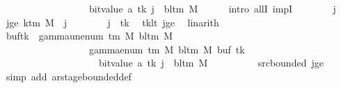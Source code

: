 \begin{isabellebody}
\ \ \ \ \ \ \ \ \ \ \ \ \ \ \ \ \ {\isacharplus}{\kern0pt}\ bit{\isacharunderscore}{\kern0pt}value\ {\isacharparenleft}{\kern0pt}{\isacharquery}{\kern0pt}a\ tk{\isacharparenright}{\kern0pt}{\isacharparenright}{\kern0pt}{\isacharparenright}{\kern0pt}{\isacharparenright}{\kern0pt}\ j\ {\isacharequal}{\kern0pt}\ bl{\isacharunderscore}{\kern0pt}tm\ M{\isachardoublequoteclose}\isanewline
\ \ \ \ \isamarkupfalse%
\ {\isacharparenleft}{\kern0pt}intro\ allI\ impI{\isacharparenright}{\kern0pt}\isanewline
\ \ \ \ \ \ \isamarkupfalse%
\ j\ \isamarkupfalse%
\ jge{\isacharcolon}{\kern0pt}\ {\isachardoublequoteopen}k{\isacharunderscore}{\kern0pt}tm\ M\ {\isasymle}\ j{\isachardoublequoteclose}\isanewline
\ \ \ \ \ \ \isamarkupfalse%
\ {\isachardoublequoteopen}j\ {\isasymnoteq}\ tk{\isachardoublequoteclose}\ \isamarkupfalse%
\ tk{\isacharunderscore}{\kern0pt}lt\ jge\ \isamarkupfalse%
\ linarith\isanewline
\ \ \ \ \ \ \isamarkupfalse%
\ {\isachardoublequoteopen}{\isacharparenleft}{\kern0pt}buf{\isacharparenleft}{\kern0pt}tk\ {\isacharcolon}{\kern0pt}{\isacharequal}{\kern0pt}\ gamma{\isacharunderscore}{\kern0pt}unenum\ {\isacharparenleft}{\kern0pt}{\isasymGamma}{\isacharunderscore}{\kern0pt}tm\ M{\isacharparenright}{\kern0pt}\ {\isacharparenleft}{\kern0pt}bl{\isacharunderscore}{\kern0pt}tm\ M{\isacharparenright}{\kern0pt}\isanewline
\ \ \ \ \ \ \ \ \ \ \ \ \ \ \ \ {\isacharparenleft}{\kern0pt}{}\ {\isacharasterisk}{\kern0pt}\ gamma{\isacharunderscore}{\kern0pt}enum\ {\isacharparenleft}{\kern0pt}{\isasymGamma}{\isacharunderscore}{\kern0pt}tm\ M{\isacharparenright}{\kern0pt}\ {\isacharparenleft}{\kern0pt}bl{\isacharunderscore}{\kern0pt}tm\ M{\isacharparenright}{\kern0pt}\ {\isacharparenleft}{\kern0pt}buf\ tk{\isacharparenright}{\kern0pt}\isanewline
\ \ \ \ \ \ \ \ \ \ \ \ \ \ \ \ \ \ \ {\isacharplus}{\kern0pt}\ bit{\isacharunderscore}{\kern0pt}value\ {\isacharparenleft}{\kern0pt}{\isacharquery}{\kern0pt}a\ tk{\isacharparenright}{\kern0pt}{\isacharparenright}{\kern0pt}{\isacharparenright}{\kern0pt}{\isacharparenright}{\kern0pt}\ j\ {\isacharequal}{\kern0pt}\ bl{\isacharunderscore}{\kern0pt}tm\ M{\isachardoublequoteclose}\isanewline
\ \ \ \ \ \ \ \ \isamarkupfalse%
\ src{\isacharunderscore}{\kern0pt}bounded\ jge\ \isamarkupfalse%
\ {\isacharparenleft}{\kern0pt}simp\ add{\isacharcolon}{\kern0pt}\ ar{\isacharunderscore}{\kern0pt}stage{\isacharunderscore}{\kern0pt}bounded{\isacharunderscore}{\kern0pt}def{\isacharparenright}{\kern0pt}\isanewline

\end{isabellebody}
